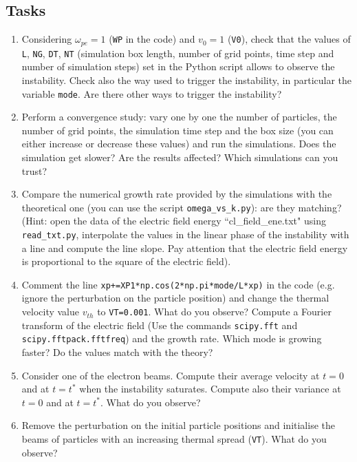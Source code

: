 \documentclass[]{exam}
\begin{document}
\subsection{Tasks}
\begin{enumerate}
\item Considering $\omega_{pe}=1$ (\texttt{WP} in the code) and $v_0=1$ (\texttt{V0}), check that the values of \texttt{L}, \texttt{NG}, \texttt{DT}, \texttt{NT} (simulation box length, number of grid points, time step and number of simulation steps) set in the Python script allows to observe the instability. Check also the way used to trigger the instability, in particular the variable \texttt{mode}. Are there other ways to trigger the instability?
 
\item Perform a convergence study: vary one by one the number of particles, the number of grid points, the simulation time step and the box size (you can either increase or decrease these values) and run the simulations. Does the simulation get slower? Are the results affected? Which simulations can you trust? 

\item \label{growth_rate} Compare the numerical growth rate provided by the simulations with the theoretical one (you can use the script \texttt{omega_vs_k.py}): are they matching? (Hint: open the data of the electric field energy ``cl_field_ene.txt" using \texttt{read_txt.py}, interpolate the values in the linear phase of the instability with a line and compute the line slope. Pay attention that the electric field energy is proportional to the square of the electric field).

\item \label{fft} Comment the line \texttt{xp+=XP1*np.cos(2*np.pi*mode/L*xp)} in the co\-de (e.g. ignore the perturbation on the particle position) and change the thermal velocity value $v_{th}$ to \texttt{VT=0.001}. What do you observe? Compute a Fourier transform of the electric field (Use the commands \texttt{scipy.fft} and \texttt{scipy.fftpack.fftfreq}) and the growth rate. Which mode is growing faster? Do the values match with the theory?

\item Consider one of the electron beams. Compute their average velocity at $t=0$ and at $t=t^{*}$ when the instability saturates. Compute also their variance at $t=0$ and at $t=t^{*}$. What do you observe?

\item Remove the perturbation on the initial particle positions and initialise the beams of particles with an increasing thermal spread (\texttt{VT}). What do you observe?


\end{enumerate}
\end{document}
